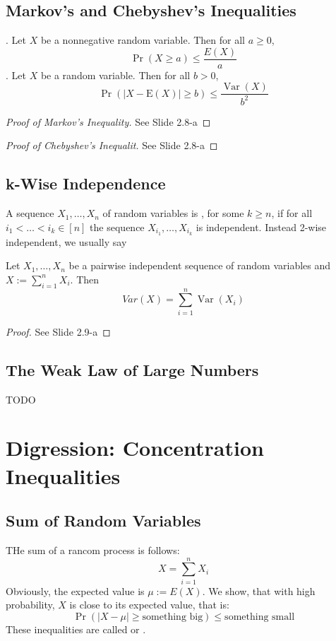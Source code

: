 \subsection{Markov's and Chebyshev's Inequalities}
. Let $X$ be a nonnegative random variable. Then for all $a \geq 0$, 
\begin{equation}
\operatorname{Pr}(X \geq a) \leq \frac{E(X)}{a}
\end{equation}
. Let $X$ be a random variable. Then for all $b > 0$,
\begin{equation}
\operatorname{Pr}(|X-\mathrm{E}(X)| \geq b) \leq \frac{\operatorname{Var}(X)}{b^{2}}
\end{equation}
\begin{proof}[Proof of Markov's Inequality]
	See Slide 2.8-a
\end{proof}
\begin{proof}[Proof of Chebyshev's Inequalit]
	See Slide 2.8-a
\end{proof}
\subsection{k-Wise Independence}
A sequence $X_1,\ldots,X_n$ of random variables is , for some $k \geq n$, if for all $i_1 < \ldots < i_k \in [n]$ the sequence $X_{i_1},\ldots,X_{i_k}$ is independent. Instead 2-wise independent, we usually say 

Let $X_1,\ldots,X_n$ be a pairwise independent sequence of random variables and $X := \sum_{i=1}^{n}X_i$. Then 
\begin{equation}
Var(X) = \sum_{i=1}^n \operatorname{Var}(X_i)
\end{equation}

\begin{proof}
	See Slide 2.9-a
\end{proof}
\subsection{The Weak Law of Large Numbers}
TODO
\section{Digression: Concentration Inequalities}
\subsection{Sum of Random Variables}
THe sum of a rancom process is follows:
\begin{equation*}
X = \sum_{i=1}^{n}X_i
\end{equation*}
Obviously, the expected value is $\mu := E(X)$. We show, that with high probability, $X$ is close to its expected value, that is: 
\begin{equation*}
\operatorname{Pr}(|X - \mu| \geq \text{something big} ) \leq \text{something small}
\end{equation*}
These inequalities are called  or .
